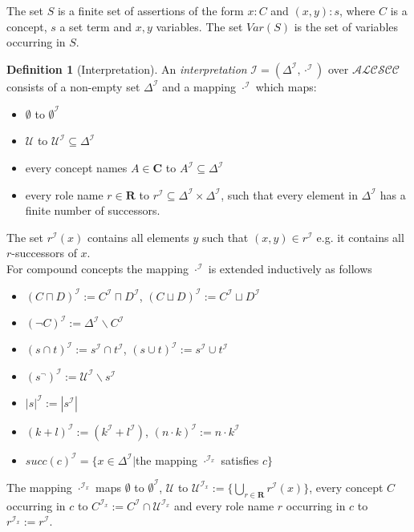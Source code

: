 \documentclass[a4paper,11pt]{scrartcl}
\theoremstyle{break}
\theoremstyle{definition}
\newtheorem{mydef}{Definition}
\begin{document}
The set $S$ is a finite set of assertions of the form $x:C$ and $(x,y):s$, where $C$ is a concept, $s$ a set term and $x,y$ variables. The set $Var(S)$ is the set of variables occurring in $S$.
\begin{mydef}[Interpretation]
An \textit{interpretation} $\mathcal{I=(\Delta^\mathcal{I},\cdot^\mathcal{I})}$ over $\mathcal{ALCSCC}$ consists of a non-empty set $\Delta^\mathcal{I}$ and a mapping $\cdot^\mathcal{I}$ which maps:
\begin{itemize}
\item $\emptyset$ to $\emptyset^\mathcal{I}$
\item $\mathcal{U}$ to $\mathcal{U}^\mathcal{I}\subseteq \Delta^\mathcal{I}$
\item every concept names $A\in\mathbf{C}$ to $A^\mathcal{I}\subseteq \Delta^\mathcal{I}$
\item every role name $r\in\mathbf{R}$ to $r^\mathcal{I}\subseteq\Delta^\mathcal{I}\times\Delta^\mathcal{I}$, such that every element in $\Delta^\mathcal{I}$ has a finite number of successors.
\end{itemize}
The set $r^\mathcal{I}(x)$ contains all elements $y$ such that $(x,y)\in r^\mathcal{I}$ e.g. it contains all $r$-successors of $x$.\\
For compound concepts the mapping $\cdot^\mathcal{I}$ is extended inductively as follows
\begin{itemize}
\item $(C\sqcap D)^\mathcal{I}:=C^\mathcal{I}\sqcap D^\mathcal{I}$, $(C\sqcup D)^\mathcal{I}:=C^\mathcal{I}\sqcup D^\mathcal{I}$
\item $(\neg C)^\mathcal{I}:=\Delta^\mathcal{I}\backslash C^\mathcal{I}$
\item $(s\cap t)^\mathcal{I}:= s^\mathcal{I}\cap t^\mathcal{I}$, $(s\cup t)^\mathcal{I}:= s^\mathcal{I}\cup t^\mathcal{I}$
\item $(s^\neg)^\mathcal{I}:=\mathcal{U}^\mathcal{I}\backslash s^\mathcal{I}$
\item $|s|^\mathcal{I}:=|s^\mathcal{I}|$
\item $(k+l)^\mathcal{I}:=(k^\mathcal{I}+l^\mathcal{I})$, $(n\cdot k)^\mathcal{I}:= n\cdot k^\mathcal{I}$
\item $succ(c)^\mathcal{I}=\{x\in \Delta^\mathcal{I}|$the mapping $\cdot^{\mathcal{I}_x}$ satisfies $c\}$
\end{itemize}
The mapping $\cdot^{\mathcal{I}_x}$ maps $\emptyset$ to $\emptyset^\mathcal{I}$, $\mathcal{U}$ to $\mathcal{U}^{\mathcal{I}_x}:=\{\bigcup_{r\in\mathbf{R}}r^\mathcal{I}(x)\}$, every concept $C$ occurring in $c$ to $C^{\mathcal{I}_x}:=C^\mathcal{I}\cap \mathcal{U}^{\mathcal{I}_x}$ and every role name $r$ occurring in $c$ to $r^{\mathcal{I}_x}:=r^\mathcal{I}$.\\

\end{mydef}
\end{document}
